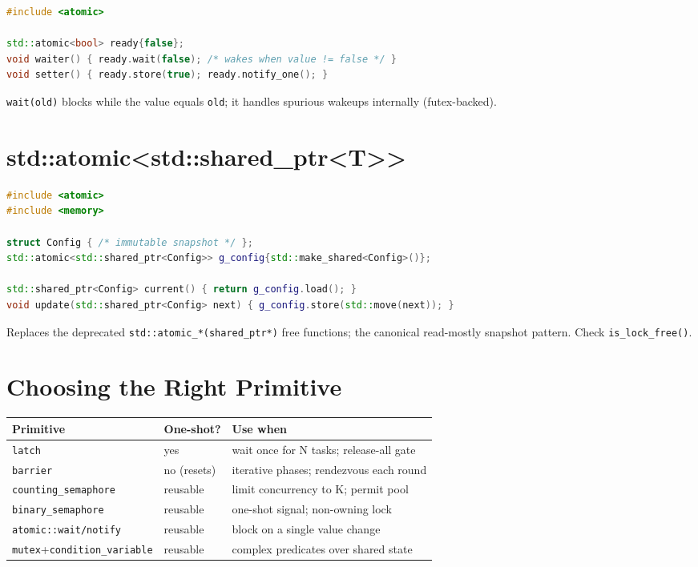 \begin{lstlisting}[language=C++,caption={Blocking on an atomic without a condition variable}]
#include <atomic>

std::atomic<bool> ready{false};
void waiter() { ready.wait(false); /* wakes when value != false */ }
void setter() { ready.store(true); ready.notify_one(); }
\end{lstlisting}

\texttt{wait(old)} blocks while the value equals \texttt{old}; it handles spurious wakeups internally (futex-backed).

\section{std::atomic<std::shared\_ptr<T>>}
\label{sec:c20-atomic-shared-ptr}

\begin{lstlisting}[language=C++,caption={Atomically swapping shared configuration}]
#include <atomic>
#include <memory>

struct Config { /* immutable snapshot */ };
std::atomic<std::shared_ptr<Config>> g_config{std::make_shared<Config>()};

std::shared_ptr<Config> current() { return g_config.load(); }
void update(std::shared_ptr<Config> next) { g_config.store(std::move(next)); }
\end{lstlisting}

Replaces the deprecated \texttt{std::atomic\_*(shared\_ptr*)} free functions; the canonical read-mostly snapshot pattern. Check \texttt{is\_lock\_free()}.

\section{Choosing the Right Primitive}
\label{sec:c20-concurrency2-choose}

\begin{center}
\begin{tabular}{lll}
\hline
\textbf{Primitive} & \textbf{One-shot?} & \textbf{Use when} \\
\hline
\texttt{latch} & yes & wait once for N tasks; release-all gate \\
\texttt{barrier} & no (resets) & iterative phases; rendezvous each round \\
\texttt{counting\_semaphore} & reusable & limit concurrency to K; permit pool \\
\texttt{binary\_semaphore} & reusable & one-shot signal; non-owning lock \\
\texttt{atomic::wait/notify} & reusable & block on a single value change \\
\texttt{mutex}+\texttt{condition\_variable} & reusable & complex predicates over shared state \\
\hline
\end{tabular}
\end{center}

